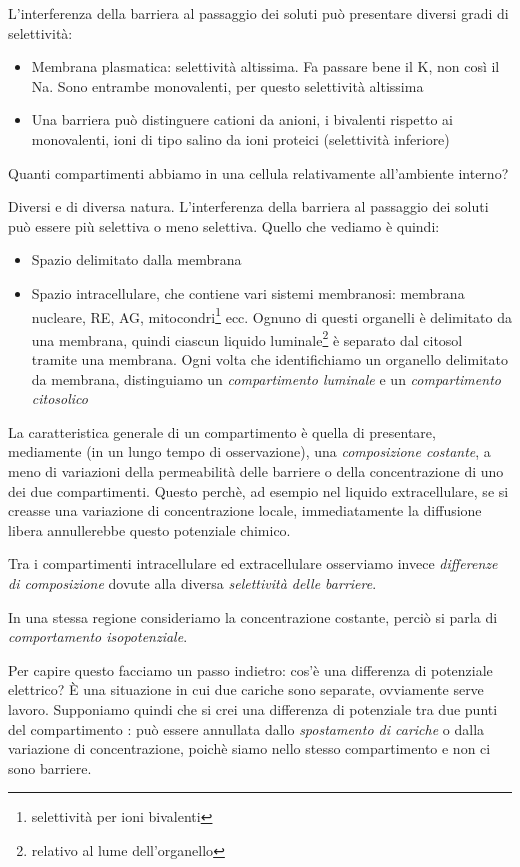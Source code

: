 \documentclass[a4paper,12pt]{article}
\begin{document}
L'interferenza della barriera al passaggio dei soluti può presentare diversi gradi di selettività:
\begin{itemize}
\item{Membrana plasmatica: selettività altissima. Fa passare bene il K, non così il Na. Sono entrambe monovalenti, per questo selettività altissima}
\item{Una barriera può distinguere cationi da anioni, i bivalenti rispetto ai monovalenti, ioni di tipo salino da ioni proteici (selettività inferiore)}
\end{itemize}

Quanti compartimenti abbiamo in una cellula relativamente all'ambiente interno? 

Diversi e di diversa natura. L'interferenza della barriera al passaggio dei soluti può essere più selettiva o meno selettiva.
Quello che vediamo è quindi:
\begin{itemize}
\item{Spazio delimitato dalla membrana}
\item{Spazio intracellulare, che contiene vari sistemi membranosi: membrana nucleare, RE, AG, mitocondri\footnote{selettività per ioni bivalenti} ecc. Ognuno di questi organelli è delimitato da una membrana, quindi ciascun liquido luminale\footnote{relativo al lume dell'organello} è separato dal citosol tramite una membrana. Ogni volta che identifichiamo un organello delimitato da membrana, distinguiamo un \emph{compartimento luminale} e un \emph{compartimento citosolico}}
\end{itemize}

La caratteristica generale di un compartimento è quella di presentare, mediamente (in un lungo tempo di osservazione), una \emph{composizione costante}, a meno di variazioni della permeabilità delle barriere o della concentrazione di uno dei due compartimenti. Questo perchè, ad esempio nel liquido extracellulare, se si creasse una variazione di concentrazione locale, immediatamente la diffusione libera  annullerebbe questo potenziale chimico.

Tra i compartimenti intracellulare ed extracellulare osserviamo invece \emph{differenze di composizione} dovute alla diversa \emph{selettività delle barriere}.

In una stessa regione consideriamo la concentrazione costante, perciò si parla di \emph{comportamento isopotenziale}.

Per capire questo facciamo un passo indietro: cos'è una differenza di potenziale elettrico? È una situazione in cui due cariche sono separate, ovviamente serve lavoro. Supponiamo quindi che si crei una differenza di potenziale tra due punti del compartimento : può essere annullata dallo \emph{spostamento di cariche} o dalla variazione di concentrazione, poichè siamo nello stesso compartimento e non ci sono barriere.
\end{document}
